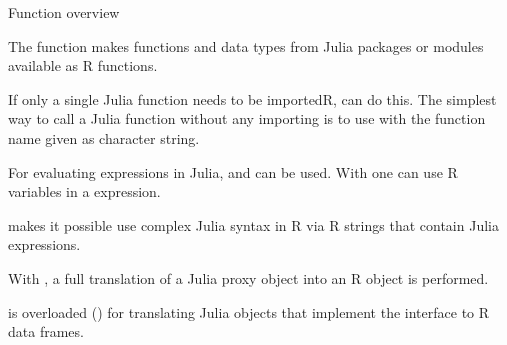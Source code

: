 \begin{Section}{Function overview}

The function  makes
functions and data types from Julia packages or modules available as R functions.

If only a single Julia function needs to be importedR, 
can do this. The simplest way to call a Julia function without any importing
is to use  with the function name given
as character string.

For evaluating expressions in Julia,  and
 can be used. With  one can use
R variables in a expression.

 makes it possible use complex Julia syntax in R via R strings
that contain Julia expressions.

With , a full translation of a Julia proxy object into an R object
is performed.

 is overloaded ()
for translating Julia objects that implement the
 interface
to R data frames.
\end{Section}
%
